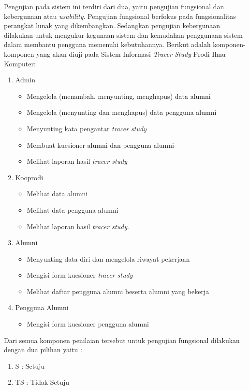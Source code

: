 Pengujian pada sistem ini terdiri dari dua, yaitu pengujian fungsional dan kebergunaan atau \textit{usability}. Pengujian fungsional berfokus pada fungsionalitas perangkat lunak yang dikembangkan. Sedangkan pengujian kebergunaan dilakukan untuk mengukur kegunaan sistem dan kemudahan penggunaan sistem dalam membantu pengguna memenuhi kebutuhannya. Berikut adalah komponen-komponen yang akan diuji pada Sistem Informasi \textit{Tracer Study} Prodi Ilmu Komputer:

\begin{enumerate}
	\item Admin
	\begin{itemize}
		\item Mengelola (menambah, menyunting, menghapus) data alumni
		\item Mengelola (menyunting dan menghapus) data pengguna alumni
		\item Menyunting kata pengantar \textit{tracer study}
		\item Membuat kuesioner alumni dan pengguna alumni
		\item Melihat laporan hasil \textit{tracer study}
	\end{itemize}
	\item Kooprodi
	\begin{itemize}
		\item Melihat data alumni
		\item Melihat data pengguna alumni
		\item Melihat laporan hasil \textit{tracer study}. 
	\end{itemize} 
	\item Alumni
	\begin{itemize}
		\item Menyunting data diri dan mengelola riwayat pekerjaan
		\item Mengisi form kuesioner \textit{tracer study}
		\item Melihat daftar pengguna alumni beserta alumni yang bekerja
	\end{itemize} 
	\item Pengguna Alumni
	 \begin{itemize}
	 	\item Mengisi form kuesioner pengguna alumni
	 \end{itemize}
\end{enumerate}
Dari semua komponen penilaian tersebut untuk pengujian fungsional dilakukan
dengan dua pilihan yaitu :
\begin{enumerate}
	\item S  : Setuju
	\item TS : Tidak Setuju
\end{enumerate}
